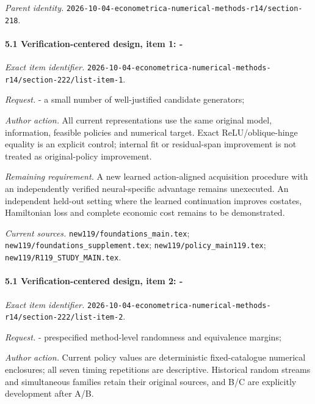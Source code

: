 \par\emph{Parent identity.} \nolinkurl{2026-10-04-econometrica-numerical-methods-r14/section-218}.

\paragraph{5.1 Verification-centered design, item 1: -}

\emph{Exact item identifier.} \nolinkurl{2026-10-04-econometrica-numerical-methods-r14/section-222/list-item-1}.

\par\emph{Request.} - a small number of well-justified candidate generators;

\par\emph{Author action.} All current representations use the same original model, information, feasible policies and numerical target. Exact ReLU/\allowbreak{}oblique-hinge equality is an explicit control; internal fit or residual-span improvement is not treated as original-policy improvement.

\par\emph{Remaining requirement.} A new learned action-aligned acquisition procedure with an independently verified neural-specific advantage remains unexecuted. An independent held-out setting where the learned continuation improves costates, Hamiltonian loss and complete economic cost remains to be demonstrated.

\par\emph{Current sources.} \nolinkurl{new119/foundations_main.tex}; \nolinkurl{new119/foundations_supplement.tex}; \nolinkurl{new119/policy_main119.tex}; \nolinkurl{new119/R119_STUDY_MAIN.tex}.

\paragraph{5.1 Verification-centered design, item 2: -}

\emph{Exact item identifier.} \nolinkurl{2026-10-04-econometrica-numerical-methods-r14/section-222/list-item-2}.

\par\emph{Request.} - prespecified method-level randomness and equivalence margins;

\par\emph{Author action.} Current policy values are deterministic fixed-catalogue numerical enclosures; all seven timing repetitions are descriptive. Historical random streams and simultaneous families retain their original sources, and B/\allowbreak{}C are explicitly development after A/\allowbreak{}B.

